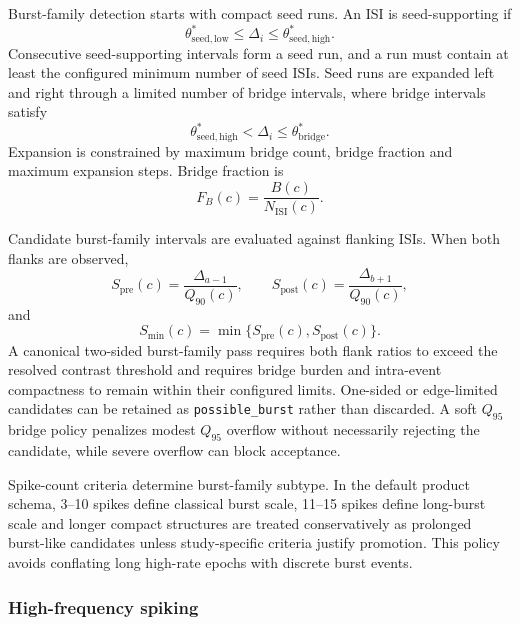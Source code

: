 \documentclass[pdflatex,sn-apa]{sn-jnl}
\newcommand{\isi}{\mathrm{ISI}}
\begin{document}
Burst-family detection starts with compact seed runs. An ISI is seed-supporting if
\begin{equation}
    \theta_{\mathrm{seed,low}}^{\ast}
    \le \Delta_i \le
    \theta_{\mathrm{seed,high}}^{\ast}.
\end{equation}
Consecutive seed-supporting intervals form a seed run, and a run must contain at least the configured minimum number of seed ISIs. Seed runs are expanded left and right through a limited number of bridge intervals, where bridge intervals satisfy
\begin{equation}
    \theta_{\mathrm{seed,high}}^{\ast}
    < \Delta_i \le
    \theta_{\mathrm{bridge}}^{\ast}.
\end{equation}
Expansion is constrained by maximum bridge count, bridge fraction and maximum expansion steps. Bridge fraction is
\begin{equation}
    F_B(c)=\frac{B(c)}{N_{\isi}(c)}.
\end{equation}

Candidate burst-family intervals are evaluated against flanking ISIs. When both flanks are observed,
\begin{equation}
    S_{\mathrm{pre}}(c)=
    \frac{\Delta_{a-1}}{Q_{90}(c)},\qquad
    S_{\mathrm{post}}(c)=
    \frac{\Delta_{b+1}}{Q_{90}(c)},
\end{equation}
and
\begin{equation}
    S_{\min}(c)=\min\{S_{\mathrm{pre}}(c),S_{\mathrm{post}}(c)\}.
\end{equation}
A canonical two-sided burst-family pass requires both flank ratios to exceed the resolved contrast threshold and requires bridge burden and intra-event compactness to remain within their configured limits. One-sided or edge-limited candidates can be retained as \texttt{possible\_burst} rather than discarded. A soft $Q_{95}$ bridge policy penalizes modest $Q_{95}$ overflow without necessarily rejecting the candidate, while severe overflow can block acceptance.

Spike-count criteria determine burst-family subtype. In the default product schema, 3--10 spikes define classical burst scale, 11--15 spikes define long-burst scale and longer compact structures are treated conservatively as prolonged burst-like candidates unless study-specific criteria justify promotion. This policy avoids conflating long high-rate epochs with discrete burst events.

\subsubsection{High-frequency spiking}
\end{document}
